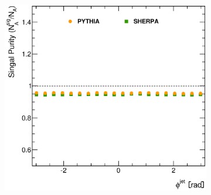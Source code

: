\documentclass[12pt, twoside]{article}
\numberwithin{equation}{section}
\numberwithin{figure}{section}
\newenvironment{changemargin}[2]{%
\begin{list}{}{%
\setlength{\topsep}{0pt}%
\setlength{\leftmargin}{#1}%
\setlength{\rightmargin}{#2}%
\setlength{\listparindent}{\parindent}%
\setlength{\itemindent}{\parindent}%
\setlength{\parsep}{\parskip}%
}%
\item[]}{\end{list}}
\begin{document}
\begin{figure}
\begin{changemargin}{-1.0cm}{-0.75cm}
\begin{changemargin}{-0.75cm}{-1.0cm}
\begin{subfigure}[b]{0.37\textwidth}
            \subcaption{}
            \label{fig:PurityRapidityJet}
        \end{subfigure}
        \begin{subfigure}[b]{0.37\textwidth}
            \includegraphics[width=\textwidth]{./images/SignalPurity/SIG_PUR-106.eps}
            \subcaption{}
            \label{fig:PurityPhiJet}
        \end{subfigure}


\end{changemargin}
\end{changemargin}
\end{figure}
\end{document}
